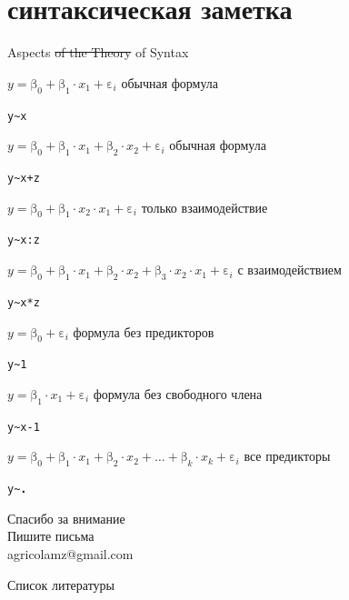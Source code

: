 \section{синтаксическая заметка}
\begin{frame}{Aspects \sout{of the Theory} of Syntax}
\begin{itemize}
\mytem $y=\mbox{β}_0+\mbox{β}_1\cdot x_1 +\mbox{ε}_i$ \hfill обычная формула\\
\scriptsize
\begin{alltt}
\alert{y\textasciitilde x}
\end{alltt}
\normalsize
\mytem $y=\mbox{β}_0+\mbox{β}_1\cdot x_1 +\mbox{β}_2\cdot x_2 +\mbox{ε}_i$ \hfill обычная формула\\
\scriptsize
\begin{alltt}
\alert{y\textasciitilde x + z}
\end{alltt}
\normalsize
\mytem $y=\mbox{β}_0+\mbox{β}_1\cdot x_2\cdot x_1 +\mbox{ε}_i$ \hfill только взаимодействие\\
\scriptsize
\begin{alltt}
\alert{y\textasciitilde x:z}
\end{alltt}
\normalsize
\mytem $y=\mbox{β}_0+\mbox{β}_1\cdot x_1 +\mbox{β}_2\cdot x_2 +\mbox{β}_3\cdot x_2\cdot x_1 +\mbox{ε}_i$ \hfill с взаимодействием\\
\scriptsize
\begin{alltt}
\alert{y\textasciitilde x*z\hfill }
\end{alltt}
\normalsize
\mytem $y=\mbox{β}_0 +\mbox{ε}_i$ \hfill формула без предикторов\\
\scriptsize
\begin{alltt}
\alert{y\textasciitilde 1}
\end{alltt}
\normalsize
\mytem $y=\mbox{β}_1\cdot x_1 +\mbox{ε}_i$ \hfill формула без свободного члена\\
\scriptsize
\begin{alltt}
\alert{y\textasciitilde x - 1}
\end{alltt}
\normalsize
\mytem $y=\mbox{β}_0+\mbox{β}_1\cdot x_1+\mbox{β}_2\cdot x_2 + \dots +\mbox{β}_k\cdot x_k +\mbox{ε}_i$ \hfill все предикторы\\
\scriptsize
\begin{alltt}
\alert{y\textasciitilde \textbf{.}}
\end{alltt}
\normalsize
\end{itemize}
\scriptsize
\begin{alltt}

\end{alltt}
\normalsize
\end{frame}

\begin{frame}
{\huge Спасибо за внимание\bigskip\\
\normalsize Пишите письма\\
agricolamz@gmail.com
\vspace{-130pt}}
\end{frame}
\begin{frame}{Список литературы}
\footnotesize


\end{frame}

